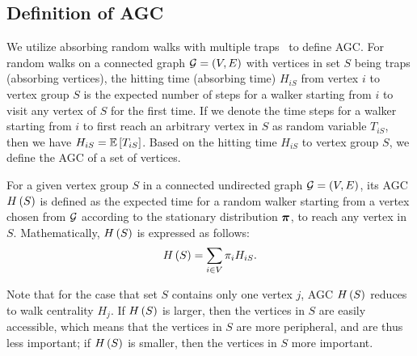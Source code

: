 \documentclass[10pt,twocolumn,twoside]{IEEEtran}
\begin{document}
\subsection{Definition of AGC}

We utilize absorbing random walks with multiple traps~\cite{ZhYaLi12} to define AGC. For random walks on a connected graph \(\mathcal{G}=(V,E)\) with vertices in set  \(S\) being traps (absorbing vertices), the hitting time (absorbing time) \(H_{iS}\) from vertex \(i\) to vertex group \(S\) is the expected number of steps for a walker starting from \(i\) to visit any vertex of \(S\) for the first time. If we denote the time steps for a walker starting from \(i\) to first reach an arbitrary vertex in \(S\) as random variable \(T_{iS}\), then we have \(H_{iS}=\mathbb{E}\left[T_{iS}\right]\). Based on the hitting time \(H_{iS}\) to  vertex group $S$, we define the AGC of a set of vertices.


\begin{definition}\label{def:manc}
    For a given vertex group \(S\) in a connected undirected graph \(\mathcal{G}=(V,E)\), its AGC \(H\left(S\right)\) is defined as the expected time for a random walker starting from a vertex chosen from \(\mathcal{G}\) according to the stationary distribution \(\boldsymbol{\pi}\), to reach any vertex in \(S\).  Mathematically, \(H\left(S\right)\) is expressed as follows:
    \begin{equation*}
        H\left(S\right)=\sum_{i\in V}\pi_i H_{iS}.
    \end{equation*}
\end{definition}
Note that for the case that set \(S\) contains only one vertex \(j\), AGC \(H\left(S\right)\) reduces to walk centrality \(H_j\). If  \(H\left(S\right)\) is larger, then the vertices in  \(S\) are easily accessible, which means that the vertices in  \(S\) are more peripheral, and are thus less important;  if  \(H\left(S\right)\) is smaller, then the vertices in  \(S\) more important.
\end{document}
